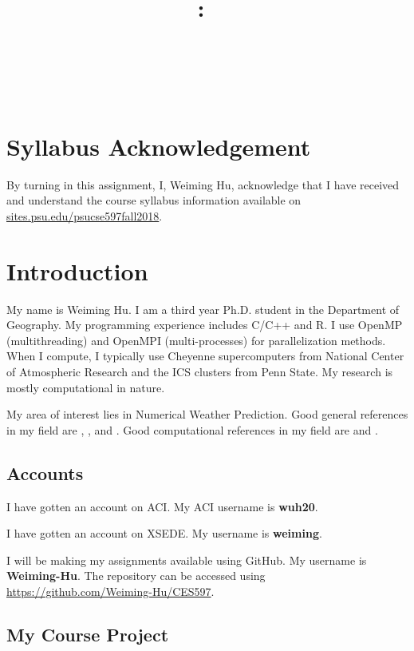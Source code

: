 \documentclass{article}
\title{\vspace{2in}\textmd{\textbf{\hmwkClass:\ \hmwkTitle}}\\\normalsize\vspace{0.1in}\small{\hmwkDueDate}\\\vspace{0.1in}\large{\textit{\hmwkClassInstructor\ \hmwkClassTime}}\vspace{3in}}
\date{}
\author{\textbf{\hmwkAuthorNameb} } %
\begin{document}
\begin{spacing}{1.1}
\maketitle

\newpage
\section{Syllabus Acknowledgement}

By turning in this assignment, I, Weiming Hu, acknowledge that I have received and understand the course syllabus information available on \url{sites.psu.edu/psucse597fall2018}. 

\section{Introduction}

My name is Weiming Hu. I am a third year Ph.D. student in the Department of Geography. My programming experience includes C/C++ and R. I use OpenMP (multithreading) and OpenMPI (multi-processes) for parallelization methods. When I compute, I typically use Cheyenne supercomputers from National Center of Atmospheric Research and the ICS clusters from Penn State. My research is mostly computational in nature.

My area of interest lies in Numerical Weather Prediction. Good general references in my field are \citet{delle2013probabilistic}, \citet{alessandrini2015analog}, and \citet{alessandrini2015novel}. Good computational references in my field are \citet{junk2015predictor} and \citet{cervone2017short}.

\subsection{Accounts}

I have gotten an account on ACI. My ACI username is \textbf{wuh20}.

I have gotten an account on XSEDE. My username is \textbf{weiming}.

I will be making my assignments available using GitHub. My username is \textbf{Weiming-Hu}. The repository can be accessed using \url{https://github.com/Weiming-Hu/CES597}.

\subsection{My Course Project}


\end{spacing}
\end{document}
